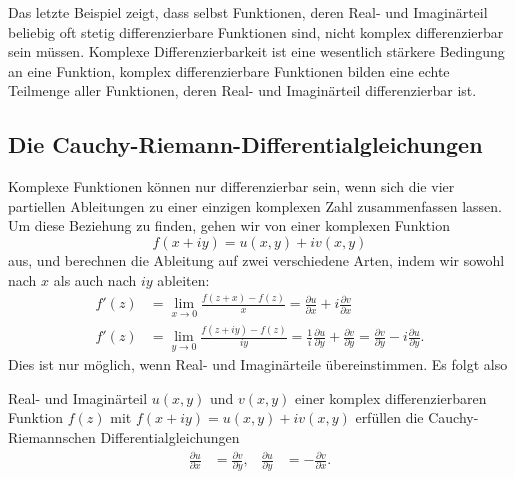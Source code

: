 Das letzte Beispiel zeigt, dass
selbst Funktionen, deren Real- und Imaginärteil beliebig oft stetig
differenzierbare Funktionen sind, nicht komplex differenzierbar
sein müssen.
Komplexe Differenzierbarkeit ist eine wesentlich stärkere Bedingung
an eine Funktion, komplex differenzierbare Funktionen bilden eine
echte Teilmenge aller Funktionen, deren Real- und Imaginärteil
differenzierbar ist.

%
%
\subsection{Die Cauchy-Riemann-Differentialgleichungen}
Komplexe Funktionen können nur differenzierbar sein, wenn sich die vier
partiellen Ableitungen zu einer einzigen komplexen Zahl zusammenfassen
lassen.
Um diese Beziehung zu finden, gehen wir von einer komplexen Funktion
\[
f(x+iy) = u(x,y) + iv(x,y)
\]
aus, und berechnen die Ableitung auf zwei verschiedene Arten, indem
wir sowohl nach $x$ als auch nach $iy$ ableiten:
\begin{align*}
f'(z)&
=
\lim_{x\to 0}\frac{f(z+x)-f(z)}{x}
=
\frac{\partial u}{\partial x}+i\frac{\partial v}{\partial x}
\\
f'(z)&
=
\lim_{y\to 0}\frac{f(z+iy)-f(z)}{iy}
=
\frac1{i}
\frac{\partial u}{\partial y}+\frac{\partial v}{\partial y}
=
\frac{\partial v}{\partial y}
-i
\frac{\partial u}{\partial y}.
\end{align*}
Dies ist nur möglich, wenn Real- und Imaginärteile übereinstimmen.
Es folgt also

\begin{satz}
\label{komplex:satz:cauchy-riemann}
Real- und Imaginärteil $u(x,y)$ und $v(x,y)$ einer
komplex differenzierbaren Funktion $f(z)$ mit $f(x+iy)=u(x,y)+iv(x,y)$
erfüllen die Cauchy-Riemannschen Differentialgleichungen
\begin{equation}
\begin{aligned}
\frac{\partial u}{\partial x}
&=
\frac{\partial v}{\partial y},
&
\frac{\partial u}{\partial y}
&=
-
\frac{\partial v}{\partial x}.
\end{aligned}
\label{komplex:dgl:cauchy-riemann}
\end{equation}
\end{satz}

